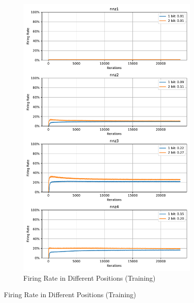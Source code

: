         \begin{figure}[H]
            \centering
            \begin{subfigure}[H]{0.8\textwidth}
                \centering
                \includegraphics[width=\textwidth]{../firerate/NMNIST/plots/nmnist_train_firerate.pdf}
                \caption{Firing Rate in Different Positions (Training)}
            \end{subfigure}
        \end{figure}
